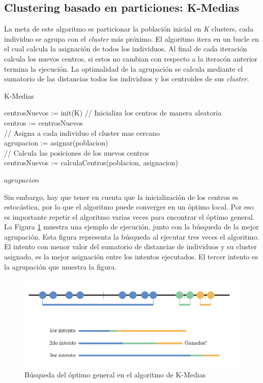 	\subsection{Clustering basado en particiones: K-Medias}

		La meta de este algoritmo es particionar la población inicial en \textit{K} clusters, cada individuo se agrupa con el \textit{cluster} más próximo. El algoritmo itera en un bucle en el cual calcula la asignación de todos los individuos. Al final de cada iteración calcula los nuevos centros, si estos no cambian con respecto a la iteracón anterior termina la ejecución. La optimalidad de la agrupación se calcula mediante el sumatorio de las distancias todos los individuos y los centroides de sus \textit{cluster}. 
		
		
		\begin{algorithm}[!h]
			\caption{K-Medias}
			centrosNuevos := init(K) // Inicializa los centros de manera aleatoria\\
			
			{
				centros := centrosNuevos\\
				// Asigna a cada individuo el cluster mas cercano\\
				agrupacion := asignar(poblacion)\\
				// Calcula las posiciones de los nuevos centros\\
				centrosNuevos := calculaCentros(poblacion, asignacion)
			}
			
			
			\Return $agrupacion$\;
		\end{algorithm}
		
		Sin embargo, hay que tener en cuenta que la inicialización de los centros es estocástica, por lo que el algoritmo puede converger en un óptimo local. Por eso es importante repetir el algoritmo varias veces para encontrar el óptimo general. La Figura \ref{fig:kmediasBusqueda} muestra una ejemplo de ejecución, junto con la búsqueda de la mejor agrupación. Esta figura representa la búsqueda al ejecutar tres veces el algoritmo. El intento con menor valor del sumatorio de distancias de individuos y su cluster asignado, es la mejor asignación entre los intentos ejecutados. El tercer intento es la agrupación que muestra la figura.


		\begin{figure}[!h]
			\centering
			\includegraphics[width=1\textwidth]{images/chapter_2/kmedias}
			\caption{Búsqueda del óptimo general en el algoritmo de K-Medias}
			\label{fig:kmediasBusqueda}
		\end{figure}



